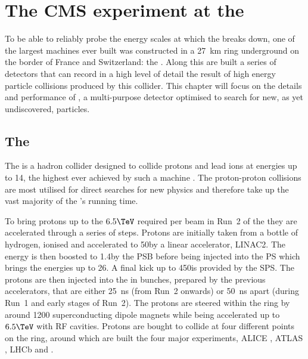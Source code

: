 \chapter{The CMS experiment at the \LHC}
\label{chap:detector}


To be able to reliably probe the energy scales at which the \SM breaks
down, one of the largest machines ever built was constructed in a
27~km ring underground on the border of France and Switzerland: the
\LHC. Along this are built a series of detectors that can record in a high
level of detail the result of high energy particle collisions produced
by this collider. This chapter will focus on the details and
performance of \CMS, a multi-purpose detector optimised to search for
new, as yet undiscovered, particles.

\section{The \LHC}
\label{sec:lhc}

The \LHC is a hadron collider designed to collide protons and lead
ions at energies up to 14\tev, the highest ever achieved by such a
machine
\cite{Evans:2008zzb,CERN-2004-003-V-1,CERN-2004-003-V-2,CERN-2004-003-V-3}.
The proton-proton collisions are most utilised for direct searches for
new physics and therefore take up the vast majority of the \LHC's
running time. 

To bring protons up to the $6.5\tev$ required per beam in Run~2 of
the \LHC they are accelerated through a series of steps. Protons are
initially taken from a bottle of hydrogen, ionised and accelerated to
50\mev by a linear accelerator, \ac{LINAC2}. The energy is then boosted to
1.4\gev by the \ac{PSB} before being injected into the \ac{PS} which
brings the energies up to 26\gev. A final kick up to 450\gev is
provided by the \ac{SPS}. The protons are then injected into the \LHC
in bunches, prepared by the previous accelerators, that are either
25~ns (from Run~2 onwards) or 50~ns apart (during Run~1 and early
stages of Run~2). The protons are steered within the \LHC ring by
around 1200 superconducting dipole magnets while being accelerated up
to $6.5\tev$ with \ac{RF} cavities. Protons are bought to collide at
four different points on the ring, around which are built the four
major \LHC experiments, ALICE \cite{Aamodt:2008zz}, ATLAS
\cite{Aad:2008zzm}, LHCb \cite{Alves:2008zz} and \CMS
\cite{Chatrchyan:2008aa}.

